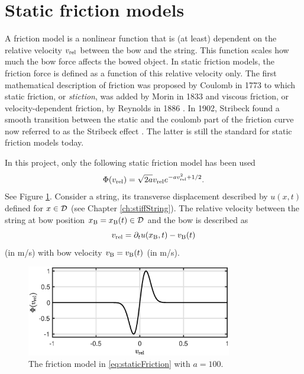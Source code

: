 \section{Static friction models}\label{sec:staticFricMod}
A friction model is a nonlinear function that is (at least) dependent on the relative velocity $v_\text{rel}$ between the bow and the string. This function scales how much the bow force affects the bowed object. 
In static friction models, the friction force is defined as a function of this relative velocity only.
The first mathematical description of friction was proposed by Coulomb in 1773 \cite{Coulomb1773} to which static friction, or \textit{stiction}, was added by Morin in 1833 \cite{Morin1833} and viscous friction, or velocity-dependent friction, by Reynolds in 1886 \cite{Reynolds1886}. In 1902, Stribeck found a smooth transition between the static and the coulomb part of the friction curve now referred to as the Stribeck effect \cite{Stribeck1902}. The latter is still the standard for static friction models today.

In this project, only the following static friction model has been used \cite{theBible}
\begin{equation}\label{eq:staticFriction}
    \Phi (v_\text{rel}) = \sqrt{2a}v_\text{rel} e^{-av_\text{rel}^2 + 1/2}.
\end{equation}
See Figure \ref{fig:frictionCharacteristic}. Consider a string, its transverse displacement described by $u(x,t)$ defined for $x\in \mathcal{D}$ (see Chapter \ref{ch:stiffString}). The relative velocity between the string at bow position $x_{\text{B}} = x_{\text{B}}(t) \in \mathcal{D}$ and the bow is described as
\begin{equation}\label{eq:vrel}
    v_\text{rel} = \partial_t u(x_{\text{B}}, t) - v_{\text{B}}(t)
\end{equation}
(in m/s) with bow velocity $v_{\text{B}} = v_{\text{B}}(t)$ (in m/s).

\begin{figure}[h]
    \centering
    \includegraphics[width=0.8\textwidth]{figures/exciters/frictionCharacteristic.eps}
    \caption{The friction model in \eqref{eq:staticFriction} with $a = 100$. \label{fig:frictionCharacteristic}}
\end{figure}

